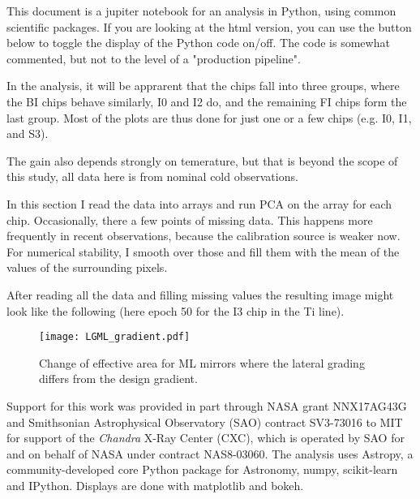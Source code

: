 \documentclass[]{spie}  %
\begin{document}
This document is a jupiter notebook for an analysis in Python, using common scientific packages. If you are looking at the html version, you can use the button below to toggle the display of the Python code on/off. The code is somewhat commented, but not to the level of a "production pipeline".

In the analysis, it will be apprarent that the chips fall into three groups, where the BI chips behave similarly, I0 and I2 do, and the remaining FI chips form the last group. Most of the plots are thus done for just one or a few chips (e.g. I0, I1, and S3).

The gain also depends strongly on temerature, but that is beyond the scope of this study, all data here is from nominal cold observations.


In this section I read the data into arrays and run PCA on the array for each chip. Occasionally, there a few points of missing data. This happens more frequently in recent observations, because the calibration source is weaker now. For numerical stability, I smooth over those and fill them with the mean of the values of the surrounding pixels.

After reading all the data and filling missing values the resulting image might look like the following (here epoch 50 for the I3 chip in the Ti line).

\begin{figure} [ht]
  \begin{center}
    \texttt{[image: LGML\_gradient.pdf]}
  \end{center}
  \caption
      { \label{fig:LGML_gradient}Change of effective area for ML mirrors where the lateral grading differs from the design gradient.
}
\end{figure}

\acknowledgments  
Support
for this work was provided in part through NASA grant NNX17AG43G and
Smithsonian Astrophysical Observatory (SAO) contract SV3-73016 to MIT
for support of the {\em Chandra} X-Ray Center (CXC), which is operated
by SAO for and on behalf of NASA under contract NAS8-03060.
The
analysis uses Astropy, a community-developed core Python
package for Astronomy\cite{astropy1,astropy2}, numpy\cite{numpy}, scikit-learn\cite{scikit-learn} and
IPython\cite{IPython}. Displays are done with
matplotlib\cite{matplotlib} and bokeh\cite{bokeh}.

\end{document}
